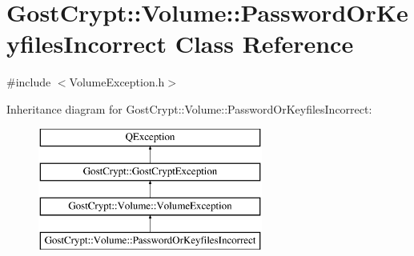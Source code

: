 \hypertarget{class_gost_crypt_1_1_volume_1_1_password_or_keyfiles_incorrect}{}\section{Gost\+Crypt\+:\+:Volume\+:\+:Password\+Or\+Keyfiles\+Incorrect Class Reference}
\label{class_gost_crypt_1_1_volume_1_1_password_or_keyfiles_incorrect}


{\ttfamily \#include $<$Volume\+Exception.\+h$>$}

Inheritance diagram for Gost\+Crypt\+:\+:Volume\+:\+:Password\+Or\+Keyfiles\+Incorrect\+:\begin{figure}[H]
\begin{center}
\leavevmode
\includegraphics[height=4.000000cm]{class_gost_crypt_1_1_volume_1_1_password_or_keyfiles_incorrect}
\end{center}
\end{figure}
